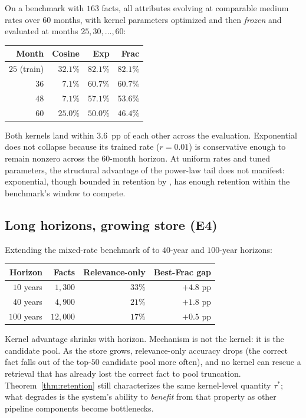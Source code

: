 \documentclass[11pt]{article}
\theoremstyle{plain}
\theoremstyle{definition}
\begin{document}
On a benchmark with $163$ facts, all attributes
evolving at comparable medium rates over $60$
months, with kernel parameters optimized and then
\emph{frozen} and evaluated at months
$25, 30, \ldots, 60$:

\begin{center}
\begin{tabular}{@{}rrrr@{}}
\toprule
Month & Cosine & Exp & Frac \\
\midrule
$25$ (train) & $32.1\%$ & $82.1\%$ & $82.1\%$ \\
$36$ & $\phantom{0}7.1\%$ & $60.7\%$ & $60.7\%$ \\
$48$ & $\phantom{0}7.1\%$ & $57.1\%$ & $53.6\%$ \\
$60$ & $25.0\%$ & $50.0\%$ & $46.4\%$ \\
\bottomrule
\end{tabular}
\end{center}

Both kernels land within $3.6$~pp of each other
across the evaluation.  Exponential does not collapse
because its trained rate ($r = 0.01$) is conservative
enough to remain nonzero across the $60$-month
horizon.  At uniform rates and tuned parameters, the
structural advantage of the power-law tail does not
manifest: exponential, though bounded in retention by
, has enough retention within the
benchmark's window to compete.

\subsection{Long horizons, growing store (E4)}

Extending the mixed-rate benchmark of
 to $40$-year and $100$-year
horizons:

\begin{center}
\begin{tabular}{@{}rrrr@{}}
\toprule
Horizon & Facts & Relevance-only & Best-Frac gap \\
\midrule
$10$ years & $\phantom{0}1{,}300$ & $33\%$
  & $+4.8$ pp \\
$40$ years & $\phantom{0}4{,}900$ & $21\%$
  & $+1.8$ pp \\
$100$ years & $12{,}000$ & $17\%$ & $+0.5$ pp \\
\bottomrule
\end{tabular}
\end{center}

Kernel advantage shrinks with horizon.  Mechanism is
not the kernel: it is the candidate pool.  As the
store grows, relevance-only accuracy drops (the
correct fact falls out of the top-$50$ candidate pool
more often), and no kernel can rescue a retrieval
that has already lost the correct fact to pool
truncation.  Theorem~\ref{thm:retention} still
characterizes the same kernel-level quantity
$\tau^*$; what degrades is the system's ability to
\emph{benefit} from that property as other pipeline
components become bottlenecks.
\end{document}
